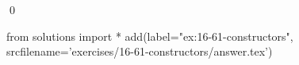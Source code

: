 
\begin{ex}
  \label{ex:16-61-constructors}
  
  \qed
\end{ex}
\begin{python0}
from solutions import *
add(label="ex:16-61-constructors",
    srcfilename='exercises/16-61-constructors/answer.tex')
\end{python0}
